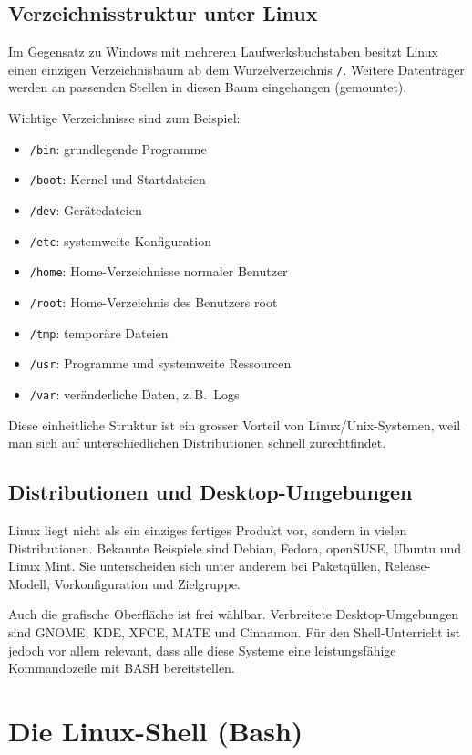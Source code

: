 \documentclass[11pt, oneside, numbers=nönddot]{scrbook}
\begin{document}
\section{Verzeichnisstruktur unter Linux}
Im Gegensatz zu Windows mit mehreren Laufwerksbuchstaben besitzt Linux einen einzigen Verzeichnisbaum ab dem Wurzelverzeichnis \texttt{/}. Weitere Datenträger werden an passenden Stellen in diesen Baum eingehangen (gemountet).

Wichtige Verzeichnisse sind zum Beispiel:
\begin{itemize}
\item \texttt{/bin}: grundlegende Programme
\item \texttt{/boot}: Kernel und Startdateien
\item \texttt{/dev}: Gerätedateien
\item \texttt{/etc}: systemweite Konfiguration
\item \texttt{/home}: Home-Verzeichnisse normaler Benutzer
\item \texttt{/root}: Home-Verzeichnis des Benutzers root
\item \texttt{/tmp}: temporäre Dateien
\item \texttt{/usr}: Programme und systemweite Ressourcen
\item \texttt{/var}: veränderliche Daten, z.\,B.\ Logs
\end{itemize}

Diese einheitliche Struktur ist ein grosser Vorteil von Linux/Unix-Systemen, weil man sich auf unterschiedlichen Distributionen schnell zurechtfindet.

\section{Distributionen und Desktop-Umgebungen}
Linux liegt nicht als ein einziges fertiges Produkt vor, sondern in vielen Distributionen. Bekannte Beispiele sind Debian, Fedora, openSUSE, Ubuntu und Linux Mint. Sie unterscheiden sich unter anderem bei Paketqüllen, Release-Modell, Vorkonfiguration und Zielgruppe.

Auch die grafische Oberfläche ist frei wählbar. Verbreitete Desktop-Umgebungen sind GNOME, KDE, XFCE, MATE und Cinnamon. Für den Shell-Unterricht ist jedoch vor allem relevant, dass alle diese Systeme eine leistungsfähige Kommandozeile mit BASH bereitstellen.

\chapter{Die Linux-Shell (Bash)}
\end{document}
